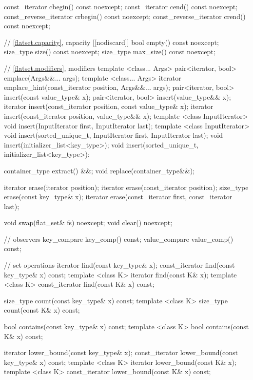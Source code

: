 \begin{codeblock}
\begin{codeblock}
\begin{codeblock}
\begin{addedblock}
\begin{codeblock}
{{    const_iterator         cbegin() const noexcept;
    const_iterator         cend() const noexcept;
    const_reverse_iterator crbegin() const noexcept;
    const_reverse_iterator crend() const noexcept;

    // \ref{flatset.capacity}, capacity
    [[nodiscard]] bool empty() const noexcept;
    size_type size() const noexcept;
    size_type max_size() const noexcept;

    // \ref{flatset.modifiers}, modifiers
    template <class... Args> pair<iterator, bool> emplace(Args&&... args);
    template <class... Args>
      iterator emplace_hint(const_iterator position, Args&&... args);
    pair<iterator, bool> insert(const value_type& x);
    pair<iterator, bool> insert(value_type&& x);
    iterator insert(const_iterator position, const value_type& x);
    iterator insert(const_iterator position, value_type&& x);
    template <class InputIterator>
      void insert(InputIterator first, InputIterator last);
    template <class InputIterator>
      void insert(sorted_unique_t, InputIterator first, InputIterator last);
    void insert(initializer_list<key_type>);
    void insert(sorted_unique_t, initializer_list<key_type>);

    container_type extract() &&;
    void replace(container_type&&);

    iterator erase(iterator position);
    iterator erase(const_iterator position);
    size_type erase(const key_type& x);
    iterator erase(const_iterator first, const_iterator last);

    void swap(flat_set& fs) noexcept;
    void clear() noexcept;

    // observers
    key_compare key_comp() const;
    value_compare value_comp() const;

    // set operations
    iterator find(const key_type& x);
    const_iterator find(const key_type& x) const;
    template <class K> iterator find(const K& x);
    template <class K> const_iterator find(const K& x) const;

    size_type count(const key_type& x) const;
    template <class K> size_type count(const K& x) const;

    bool contains(const key_type& x) const;
    template <class K> bool contains(const K& x) const;

    iterator lower_bound(const key_type& x);
    const_iterator lower_bound(const key_type& x) const;
    template <class K> iterator lower_bound(const K& x);
    template <class K> const_iterator lower_bound(const K& x) const;

}}
\end{codeblock}
\end{addedblock}
\end{codeblock}
\end{codeblock}
\end{codeblock}
